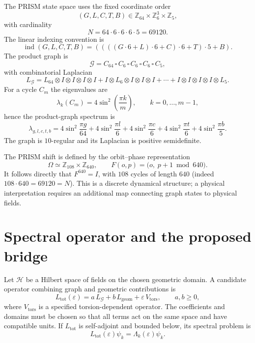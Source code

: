 \documentclass[11pt,a4paper]{article}
\newcommand{\ZZ}{\mathbb{Z}}
\begin{document}
The PRISM state space uses the fixed coordinate order
\begin{equation}
(G,L,C,T,B)\in\ZZ_{64}\times\ZZ_6^3\times\ZZ_5,
\end{equation}
with cardinality
\begin{equation}
N=64\cdot6\cdot6\cdot6\cdot5=69120 .
\end{equation}
The linear indexing convention is
\begin{equation}
\operatorname{ind}(G,L,C,T,B)=((((G\cdot6+L)\cdot6+C)\cdot6+T)\cdot5+B).
\end{equation}
The product graph is
\begin{equation}
\mathcal G=C_{64}\,\square\,C_6\,\square\,C_6\,\square\,C_6\,\square\,C_5,
\end{equation}
with combinatorial Laplacian
\begin{equation}
L_{\mathcal G}=L_{64}\otimes I\otimes I\otimes I\otimes I
+I\otimes L_6\otimes I\otimes I\otimes I+\cdots
+I\otimes I\otimes I\otimes I\otimes L_5 .
\end{equation}
For a cycle $C_m$ the eigenvalues are
\begin{equation}
\lambda_k(C_m)=4\sin^2\!\left(\frac{\pi k}{m}\right),\qquad k=0,\ldots,m-1,
\end{equation}
hence the product-graph spectrum is
\begin{equation}
\lambda_{g,l,c,t,b}=4\sin^2\!\frac{\pi g}{64}+4\sin^2\!\frac{\pi l}{6}
+4\sin^2\!\frac{\pi c}{6}+4\sin^2\!\frac{\pi t}{6}+4\sin^2\!\frac{\pi b}{5}.
\end{equation}
The graph is $10$-regular and its Laplacian is positive semidefinite.

The PRISM shift is defined by the orbit--phase representation
\begin{equation}
\Omega\simeq\ZZ_{108}\times\ZZ_{640},\qquad
F(o,p)=\bigl(o,\;p+1 \bmod 640\bigr).
\end{equation}
It follows directly that $F^{640}=I$, with $108$ cycles of length $640$
(indeed $108\cdot640=69120=N$). This is a discrete dynamical structure; a
physical interpretation requires an additional map connecting graph states to
physical fields.

\section{Spectral operator and the proposed bridge}

Let $\mathcal H$ be a Hilbert space of fields on the chosen geometric domain.
A candidate operator combining graph and geometric contributions is
\begin{equation}
L_{\mathrm{tot}}(\varepsilon)=a\,L_{\mathcal G}+b\,L_{\mathrm{geom}}
+\varepsilon\,V_{\mathrm{tors}},\qquad a,b\geq0,
\end{equation}
where $V_{\mathrm{tors}}$ is a specified torsion-dependent operator. The
coefficients and domains must be chosen so that all terms act on the same space
and have compatible units. If $L_{\mathrm{tot}}$ is self-adjoint and bounded
below, its spectral problem is
\begin{equation}
L_{\mathrm{tot}}(\varepsilon)\psi_k=\Lambda_k(\varepsilon)\psi_k .
\end{equation}
\end{document}

